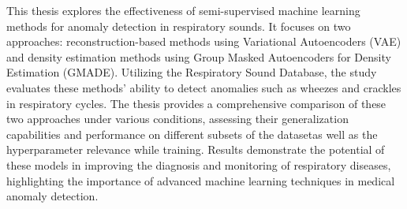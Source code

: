 
\cleardoubleoddpage%
\begin{abstract*}
    This thesis explores the effectiveness of semi-supervised machine learning methods for anomaly detection in respiratory sounds. It focuses on two approaches: reconstruction-based methods using Variational Autoencoders (VAE) and density estimation methods using Group Masked Autoencoders for Density Estimation (GMADE). Utilizing the Respiratory Sound Database, the study evaluates these methods' ability to detect anomalies such as wheezes and crackles in respiratory cycles. The thesis provides a comprehensive comparison of these two approaches under various conditions, assessing their generalization capabilities and performance on different subsets of the datasetas well as the hyperparameter relevance while training. Results demonstrate the potential of these models in improving the diagnosis and monitoring of respiratory diseases, highlighting the importance of advanced machine learning techniques in medical anomaly detection.
\end{abstract*}





